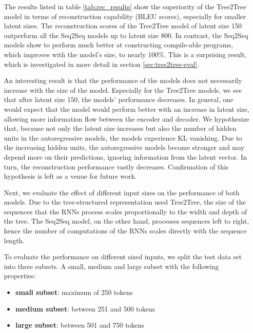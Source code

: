 The results listed in table \ref{tab:rec_results} show the superiority of the Tree2Tree model in terms of reconstruction capability (BLEU scores), especially for smaller latent sizes. The reconstruction scores of the Tree2Tree model of latent size 150 outperform all the Seq2Seq models up to latent size 800. In contrast, the Seq2Seq models show to perform much better at constructing compile-able programs, which improves with the model's size, to nearly 100\%. This is a surprising result, which is investigated in more detail in section \ref{sec:tree2tree-eval}.

 


An interesting result is that the performance of the models does not necessarily increase with the size of the model. Especially for the Tree2Tree models, we see that after latent size 150, the models' performance decreases. In general, one would expect that the model would perform better with an increase in latent size, allowing more information flow between the encoder and decoder. We hypothesize that, because not only the latent size increases but also the number of hidden units in the autoregressive models, the models experience KL vanishing. Due to the increasing hidden units, the autoregressive models become stronger and may depend more on their predictions, ignoring information from the latent vector. In turn, the reconstruction performance vastly decreases. Confirmation of this hypothesis is left as a venue for future work.



Next, we evaluate the effect of different input sizes on the performance of both models. Due to the tree-structured representation used Tree2Tree, the size of the sequences that the RNNs process scales proportionally to the width and depth of the tree. The Seq2Seq model, on the other hand, processes sequences left to right, hence the number of computations of the RNNs scales directly with the sequence length. 



To evaluate the performance on different sized inputs, we split the test data set into three subsets. A small, medium and large subset with the following properties:

\begin{itemize}
    \item \textbf{small subset}: maximum of 250 tokens
    \item \textbf{medium subset}: between 251 and 500 tokens
    \item \textbf{large subset}: between 501 and 750 tokens
\end{itemize}

